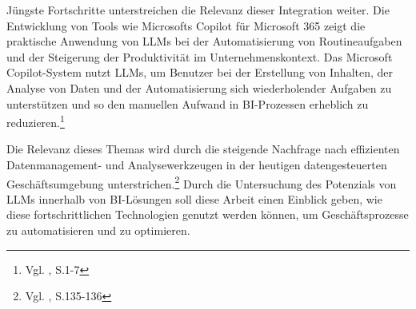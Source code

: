 Jüngste Fortschritte unterstreichen die Relevanz dieser Integration weiter. Die Entwicklung von Tools wie Microsofts Copilot für Microsoft 365 zeigt die praktische Anwendung von LLMs bei der Automatisierung von Routineaufgaben und der Steigerung der Produktivität im Unternehmenskontext. Das Microsoft Copilot-System nutzt LLMs, um Benutzer bei der Erstellung von Inhalten, der Analyse von Daten und der Automatisierung sich wiederholender Aufgaben zu unterstützen und so den manuellen Aufwand in BI-Prozessen erheblich zu reduzieren.\footnote{Vgl. \cite{Spataro2024}, S.1-7}

Die Relevanz dieses Themas wird durch die steigende Nachfrage nach effizienten Datenmanagement- und Analysewerkzeugen in der heutigen datengesteuerten Geschäftsumgebung unterstrichen.\footnote{Vgl. \cite{Syam2018}, S.135-136} Durch die Untersuchung des Potenzials von LLMs innerhalb von BI-Lösungen soll diese Arbeit einen Einblick geben, wie diese fortschrittlichen Technologien genutzt werden können, um Geschäftsprozesse zu automatisieren und zu optimieren.

\newpage